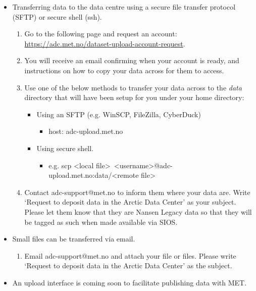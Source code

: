 \documentclass[a4paper,english, 11pt]{article}
\begin{document}
\begin{itemize}
\item Transferring data to the data centre using a secure file transfer protocol (SFTP) or secure shell (ssh).

\begin{enumerate}
\item Go to the following page and request an account:\\ \url{https://adc.met.no/dataset-upload-account-request}.
\item You will receive an email confirming when your account is ready, and instructions on how to copy your data across for them to access.
\item Use one of the below methods to transfer your data across to the \textit{data} directory that will have been setup for you under your home directory:
\begin{itemize}
\item Using an SFTP (e.g. WinSCP, FileZilla, CyberDuck)
\begin{itemize}
\item host: adc-upload.met.no
\end{itemize}
\item Using secure shell.
\begin{itemize}
\item e.g. scp \textless local file\textgreater \ \textless username\textgreater @adc-upload.met.no:data/\textless remote file\textgreater
\end{itemize}
\end{itemize}
\item Contact adc-support@met.no to inform them where your data are. Write `Request to deposit data in the Arctic Data Center' as your subject. Please let them know that they are Nansen Legacy data so that they will be tagged as such when made available via SIOS.
\end{enumerate}

\item Small files can be transferred via email.
\begin{enumerate}
\item Email adc-support@met.no and attach your file or files. Please write `Request to deposit data in the Arctic Data Center' as the subject.
\end{enumerate}

\item An upload interface is coming soon to facilitate publishing data with MET.

\end{itemize}
\end{document}
